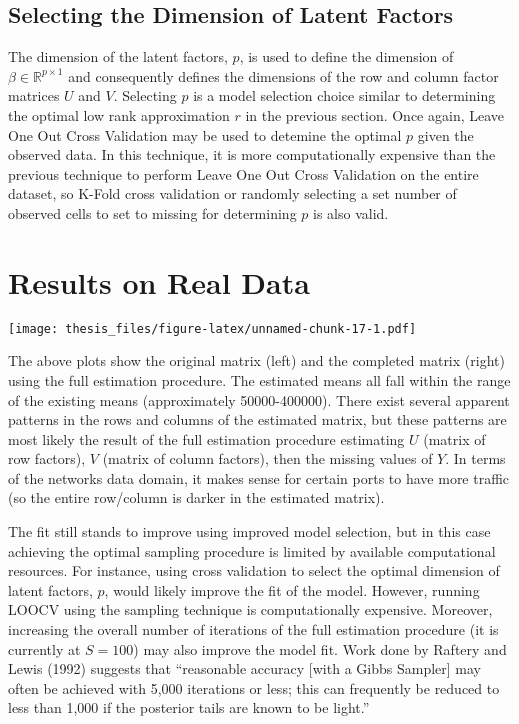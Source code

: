 \documentclass[12pt,twoside]{dukestatscithesis}
\theoremstyle{definition}
\theoremstyle{definition}
\theoremstyle{definition}
\theoremstyle{remark}
\begin{document}
\subsection{Selecting the Dimension of Latent
Factors}\label{selecting-the-dimension-of-latent-factors}

The dimension of the latent factors, \(p\), is used to define the
dimension of \(\beta \in \mathbb{R}^{p \times 1}\) and consequently
defines the dimensions of the row and column factor matrices \(U\) and
\(V\). Selecting \(p\) is a model selection choice similar to
determining the optimal low rank approximation \(r\) in the previous
section. Once again, Leave One Out Cross Validation may be used to
detemine the optimal \(p\) given the observed data. In this technique,
it is more computationally expensive than the previous technique to
perform Leave One Out Cross Validation on the entire dataset, so K-Fold
cross validation or randomly selecting a set number of observed cells to
set to missing for determining \(p\) is also valid.

\section{Results on Real Data}\label{results-on-real-data-1}

\texttt{[image: thesis\_files/figure-latex/unnamed-chunk-17-1.pdf]}

The above plots show the original matrix (left) and the completed matrix
(right) using the full estimation procedure. The estimated means all
fall within the range of the existing means (approximately
50000-400000). There exist several apparent patterns in the rows and
columns of the estimated matrix, but these patterns are most likely the
result of the full estimation procedure estimating \(U\) (matrix of row
factors), \(V\) (matrix of column factors), then the missing values of
\(Y\). In terms of the networks data domain, it makes sense for certain
ports to have more traffic (so the entire row/column is darker in the
estimated matrix).

The fit still stands to improve using improved model selection, but in
this case achieving the optimal sampling procedure is limited by
available computational resources. For instance, using cross validation
to select the optimal dimension of latent factors, \(p\), would likely
improve the fit of the model. However, running LOOCV using the sampling
technique is computationally expensive. Moreover, increasing the overall
number of iterations of the full estimation procedure (it is currently
at \(S = 100\)) may also improve the model fit. Work done by Raftery and
Lewis (1992) suggests that ``reasonable accuracy {[}with a Gibbs
Sampler{]} may often be achieved with 5,000 iterations or less; this can
frequently be reduced to less than 1,000 if the posterior tails are
known to be light.''
\end{document}
